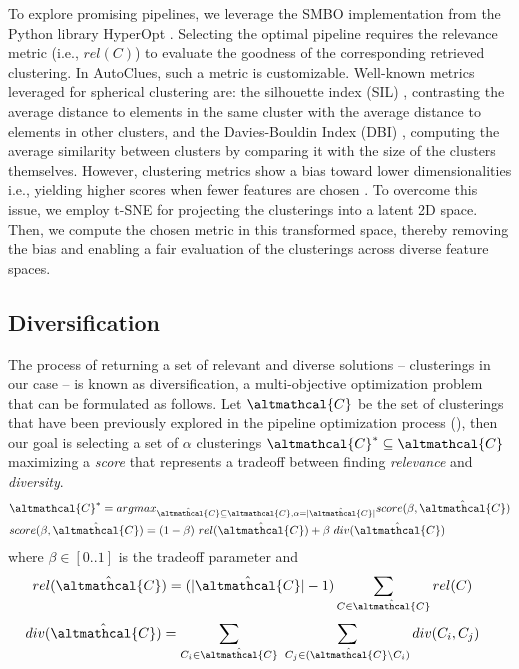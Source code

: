 To explore promising pipelines, we leverage the SMBO implementation from the Python library HyperOpt \cite{HyperOptICML13}.
Selecting the optimal pipeline requires the relevance metric (i.e., $rel(C)$) to evaluate the goodness of the corresponding retrieved clustering.
In AutoClues, such a metric is customizable.
Well-known metrics leveraged for spherical clustering are: the silhouette index (SIL) \cite{zhu2010clustering}, contrasting the average distance to elements in the same cluster with the average distance to elements in other clusters, and the Davies-Bouldin Index (DBI) \cite{dbi}, computing the average similarity between clusters by comparing it with the size of the clusters themselves.
However, clustering metrics show a bias toward lower dimensionalities i.e., yielding higher scores when fewer features are chosen \cite{lensen2017using,hancer2020new}.
To overcome this issue, we employ t-SNE \cite{van2008visualizing} for projecting the clusterings into a latent 2D space.
Then, we compute the chosen metric in this transformed space, thereby removing the bias and enabling a fair evaluation of the clusterings across diverse feature spaces.


\subsection{Diversification}
\label{clustering-ssec:diversification}

The process of returning a set of relevant and diverse solutions -- clusterings in our case -- is known as diversification, a multi-objective optimization problem that can be formulated as follows.
Let $\altmathcal{C}$ be the set of clusterings that have been previously explored in the pipeline optimization process (), then our goal is selecting a set of $\alpha$ clusterings $\altmathcal{C}^* \subseteq \altmathcal{C}$ maximizing a \textit{score} that represents a tradeoff between finding \textit{relevance} and \textit{diversity}.
\begin{align}\label{def:score}
&\altmathcal{C}^* = argmax_{\hat{\altmathcal{C}} \subseteq \altmathcal{C}, \alpha=|\hat{\altmathcal{C}}|} score(\beta, \hat{\altmathcal{C}})\\
&score(\beta, \hat{\altmathcal{C}}) = (1-\beta)~rel(\hat{\altmathcal{C}}) + \beta~div(\hat{\altmathcal{C}})
\end{align}
where $\beta \in [0.. 1]$ is the tradeoff parameter and
\begin{align}
rel(\hat{\altmathcal{C}}) &= (|\hat{\altmathcal{C}}|-1)\sum_{C \in \hat{\altmathcal{C}}} rel(C)
\label{def:rel}
\end{align}
\begin{align}
div(\hat{\altmathcal{C}}) &= \sum_{C_i \in \hat{\altmathcal{C}}}~\sum_{C_j \in (\hat{\altmathcal{C}} \setminus C_i)} div(C_i, C_j)
\label{def:div}
\end{align}

